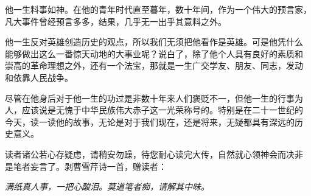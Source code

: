 \documentclass[../../dazhuan.tex]{subfiles}
\begin{document}
他一生料事如神。在他的青年时代直至暮年，数十年间，作为一个伟大的预言家，
凡大事件曾经预言多多，结果，几乎无一出乎其意料之外。

他一生反对英雄创造历史的观点，所以我们无须把他看作是英雄。可是他凭什么
能够做出这么一番惊天动地的大事业呢？说白了，除了他个人具有良好的素质和
崇高的革命理想之外，还有一个法宝，那就是一生广交学友、朋友、同志，发动
和依靠人民战争。

尽管在他身后对于他一生的功过是非数十年来人们褒贬不一，但他一生的行事为
人，应该说是无愧于中华民族伟大赤子这一光荣称号的。特别是在二十一世纪的
今天，读一读他的故事，无论是对于我们现在，还是将来，无疑都具有深远的历
史意义。 

读者诸公若心存疑虑，请稍安勿躁，待您耐心读完大传，自然就心领神会而决非
是笔者妄言了。剥曹雪芹诗一首，赠读者：

\emph{满纸真人事，一把心酸泪。莫道笔者痴，请解其中味。}
   
\end{document}
